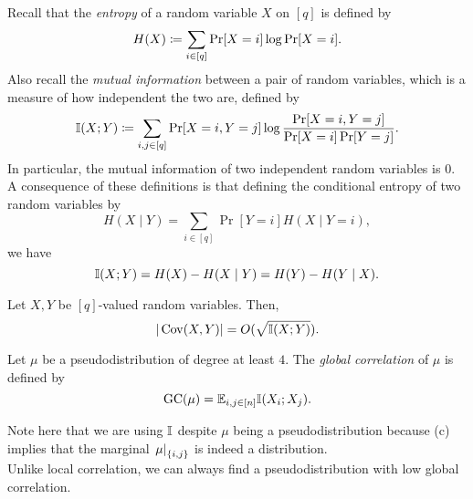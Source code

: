 	Recall that the \emph{entropy} of a random variable $X$ on $[q]$ is defined by
	\[ H(X) \coloneqq \sum_{i \in [q]} \Pr[X = i] \log \Pr[X = i]. \]
	Also recall the \emph{mutual information} between a pair of random variables, which is a measure of how independent the two are, defined by
	\[ \mathbb{I}(X;Y) \coloneqq \sum_{i,j \in [q]} \Pr[X=i,Y=j] \log \frac{\Pr[X=i,Y=j]}{\Pr[X=i]\Pr[Y=j]}. \]
	In particular, the mutual information of two independent random variables is $0$. A consequence of these definitions is that defining the conditional entropy of two random variables by
	\[ H(X\mid Y) = \sum_{i \in [q]} \Pr[Y = i] H(X \mid Y = i), \]
	we have
	\[ \mathbb{I}(X;Y) = H(X) - H(X\mid Y) = H(Y) - H(Y\mid X). \]

	\begin{fprop}
		\label{prop:cov-mutinfo}
		Let $X,Y$ be $[q]$-valued random variables. Then,
		\[ |\operatorname{Cov}(X,Y)| = O(\sqrt{\mathbb{I}(X;Y)}). \]
	\end{fprop}

	\begin{fdef}
		Let $\mu$ be a pseudodistribution of degree at least $4$. The \emph{global correlation} of $\mu$ is defined by
		\[ \operatorname{GC}(\mu) = \mathbb{E}_{i,j \in [n]} \mathbb{I}(X_i;X_j). \]
	\end{fdef}
	Note here that we are using $\mathbb{I}$ despite $\mu$ being a pseudodistribution because (c) implies that the marginal $\left.\mu\right|_{\{i,j\}}$ is indeed a distribution.\\
	Unlike local correlation, we can always find a pseudodistribution with low global correlation.

